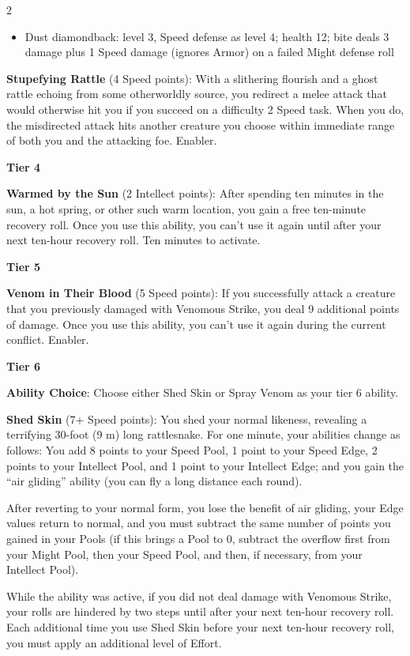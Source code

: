 \begin{multicols}{2}
\begin{itemize}
\item Dust diamondback: level 3, Speed defense as level 4; health 12; bite deals 3 damage plus 1 Speed damage (ignores Armor) on a failed Might defense roll
\end{itemize}

\textbf{Stupefying Rattle} (4 Speed points): With a slithering flourish and a ghost rattle echoing from some otherworldly source, you redirect a melee attack that would otherwise hit you if you succeed on a difficulty 2 Speed task. When you do, the misdirected attack hits another creature you choose within immediate range of both you and the attacking foe. Enabler. 

\textbf{Tier 4} 

\textbf{Warmed by the Sun} (2 Intellect points): After spending ten minutes in the sun, a hot spring, or other such warm location, you gain a free ten-minute recovery roll. Once you use this ability, you can’t use it again until after your next ten-hour recovery roll. Ten minutes to activate. 

\textbf{Tier 5} 

\textbf{Venom in Their Blood} (5 Speed points): If you successfully attack a creature that you previously damaged with Venomous Strike, you deal 9 additional points of damage. Once you use this ability, you can’t use it again during the current conflict. Enabler. 

\textbf{Tier 6} 

\textbf{Ability Choice}: Choose either Shed Skin or Spray Venom as your tier 6 ability. 

\textbf{Shed Skin} (7+ Speed points): You shed your normal likeness, revealing a terrifying 30-foot (9 m) long rattlesnake. For one minute, your abilities change as follows: You add 8 points to your Speed Pool, 1 point to your Speed Edge, 2 points to your Intellect Pool, and 1 point to your Intellect Edge; and you gain the “air gliding” ability (you can fly a long distance each round). 

After reverting to your normal form, you lose the benefit of air gliding, your Edge values return to normal, and you must subtract the same number of points you gained in your Pools (if this brings a Pool to 0, subtract the overflow first from your Might Pool, then your Speed Pool, and then, if necessary, from your Intellect Pool). 

While the ability was active, if you did not deal damage with Venomous Strike, your rolls are hindered by two steps until after your next ten-hour recovery roll. Each additional time you use Shed Skin before your next ten-hour recovery roll, you must apply an additional level of Effort. 


\end{multicols}
